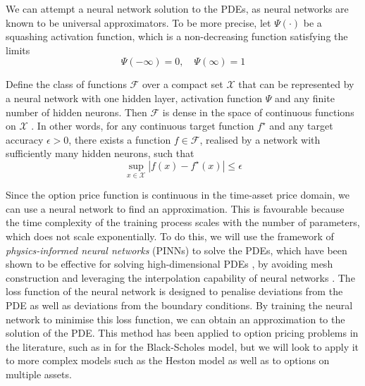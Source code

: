 We can attempt a neural network solution to the PDEs, as neural networks are known to be universal approximators. To be more precise, let $\Psi(\cdot)$ be a squashing activation function, which is a non-decreasing function satisfying the limits
\begin{equation}
    \Psi(-\infty) = 0, \quad \Psi(\infty) = 1
\end{equation}

Define the class of functions $\mathscr F$ over a compact set $\mathcal X$ that can be represented by a neural network with one hidden layer, activation function $\Psi$ and any finite number of hidden neurons. Then $\mathscr F$ is dense in the space of continuous functions on $\mathcal X$ \cite{hornik1989multilayer}. In other words, for any continuous target function $f^\star$ and any target accuracy $\epsilon > 0$, there exists a function $f \in \mathscr F$, realised by a network with sufficiently many hidden neurons, such that
\begin{equation}
    \sup_{x \in \mathcal X} |f(x) - f^\star(x)| \le \epsilon
\end{equation}

Since the option price function is continuous in the time-asset price domain, we can use a neural network to find an approximation. This is favourable because the time complexity of the training process scales with the number of parameters, which does not scale exponentially. To do this, we will use the framework of \textit{physics-informed neural networks} (PINNs) to solve the PDEs, which have been shown to be effective for solving high-dimensional PDEs \cite{raissi2019physics}, by avoiding mesh construction and leveraging the interpolation capability of neural networks \cite{hu2024tackling}. The loss function of the neural network is designed to penalise deviations from the PDE as well as deviations from the boundary conditions. By training the neural network to minimise this loss function, we can obtain an approximation to the solution of the PDE. This method has been applied to option pricing problems in the literature, such as in \cite{dhiman2023physics} for the Black-Scholes model, but we will look to apply it to more complex models such as the Heston model as well as to options on multiple assets. 

